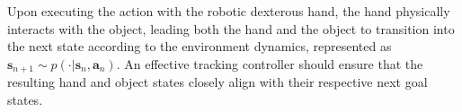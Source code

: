 Upon executing the action with the robotic dexterous hand, the hand physically interacts with the object, leading both the hand and the object to transition into the next state according to the environment dynamics, represented as \(\mathbf{s}_{n+1} \sim p(\cdot \vert \mathbf{s}_n, \mathbf{a}_n)\). 
An effective tracking controller should ensure that the resulting hand and object states closely align with their respective next goal states.






